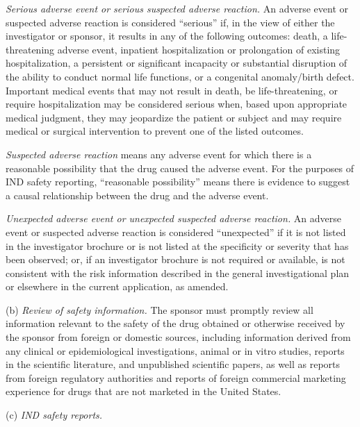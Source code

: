 \documentclass[11pt]{article}
\begin{document}
\textit{Serious adverse event or serious suspected adverse reaction.} An adverse event or suspected adverse reaction is considered ``serious'' if, in the view of either the investigator or sponsor, it results in any of the following outcomes: death, a life-threatening adverse event, inpatient hospitalization or prolongation of existing hospitalization, a persistent or significant incapacity or substantial disruption of the ability to conduct normal life functions, or a congenital anomaly/birth defect. Important medical events that may not result in death, be life-threatening, or require hospitalization may be considered serious when, based upon appropriate medical judgment, they may jeopardize the patient or subject and may require medical or surgical intervention to prevent one of the listed outcomes.

\textit{Suspected adverse reaction} means any adverse event for which there is a reasonable possibility that the drug caused the adverse event. For the purposes of IND safety reporting, ``reasonable possibility'' means there is evidence to suggest a causal relationship between the drug and the adverse event.

\textit{Unexpected adverse event or unexpected suspected adverse reaction.} An adverse event or suspected adverse reaction is considered ``unexpected'' if it is not listed in the investigator brochure or is not listed at the specificity or severity that has been observed; or, if an investigator brochure is not required or available, is not consistent with the risk information described in the general investigational plan or elsewhere in the current application, as amended.

(b) \textit{Review of safety information.} The sponsor must promptly review all information relevant to the safety of the drug obtained or otherwise received by the sponsor from foreign or domestic sources, including information derived from any clinical or epidemiological investigations, animal or in vitro studies, reports in the scientific literature, and unpublished scientific papers, as well as reports from foreign regulatory authorities and reports of foreign commercial marketing experience for drugs that are not marketed in the United States.

(c) \textit{IND safety reports.}
\end{document}
